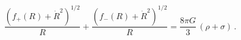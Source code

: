 \begin{equation}
\frac{\left(f_+(R)+\dot{R}^2\right)^{1/2}}{R}+\frac{\left(f_-(R)+
\dot{R}^2\right)^{1/2}}{R}=\frac{8\pi G}{3}\,(\rho+\sigma)\,.
\label{asymmetric}
\end{equation}

